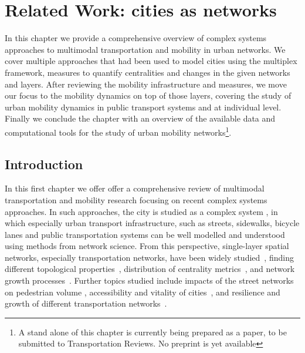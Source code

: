\chapter{Related Work: cities as networks}\label{ch:litReview}

In this chapter we provide a comprehensive overview of complex systems approaches to multimodal transportation and mobility in urban networks. We cover multiple approaches that had been used to model cities using the multiplex framework, measures to quantify centralities and changes in the given networks and layers. After reviewing the mobility infrastructure and measures, we move our focus to the mobility dynamics on top of those layers, covering the study of urban mobility dynamics in public transport systems and at individual level. Finally we conclude the chapter with an overview of the available data and computational tools for the study of urban mobility networks\footnote{A stand alone of this chapter is currently being prepared as a paper, to be submitted to Transportation Reviews. No preprint is yet available}.

\section{Introduction}
In this first chapter we offer offer a comprehensive review of multimodal transportation and mobility research focusing on recent complex systems approaches. In such approaches, the city is studied as a complex system \cite{batty2013new,lobo2020urban}, in which especially urban transport infrastructure, such as streets, sidewalks, bicycle lanes and public transportation systems can be well modelled and understood using methods from network science. From this perspective, single-layer spatial networks, especially transportation networks, have been widely studied~\cite{lin2013complex,barthelemy2011spatial,ding2019application}, finding different topological properties~\cite{jiang2004topological,cardillo2006structural,barthelemy2008patterns,batty2008size,barthelemy2011spatial,strano2013comparative,louf2014typology,boeing2020multiscale}, distribution of centrality metrics~\cite{crucitti2008centrality,Boeing2020Planarity,kirkley2018structural}, and network growth processes~\cite{makse1995growth,strano2012evolution}. Further topics studied include impacts of the street networks on pedestrian volume \cite{hajrasouliha2015connectivity}, accessibility and vitality of cities~\cite{denadai2016death,biazzo2019accesibility,natera2020walkability}, and resilience and growth of different transportation networks~\cite{baggag2018resilience,ferretti2019resilience,natera2020growth}. %

